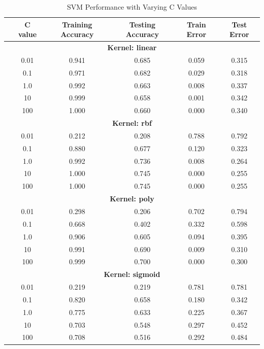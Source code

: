 \documentclass[a4paper,10 pt]{article}
\begin{document}
    \begin{table}[H]
      \centering
      \caption{SVM Performance with Varying C Values}
      \label{tab:svm_performance}
      \begin{tabular}{@{}cccccc@{}}
                \toprule
         & C value & Training Accuracy & Testing Accuracy & Train Error & Test Error \\
        \midrule
        \multicolumn{6}{c}{\textbf{Kernel: linear}} \\
        \midrule
        & 0.01 & 0.941 & 0.685 & 0.059 & 0.315 \\
        & 0.1 & 0.971 & 0.682 & 0.029 & 0.318 \\
        & 1.0 & 0.992 & 0.663 & 0.008 & 0.337 \\
        & 10 & 0.999 & 0.658 & 0.001 & 0.342 \\
        & 100 & 1.000 & 0.660 & 0.000 & 0.340 \\
        \midrule
        \multicolumn{6}{c}{\textbf{Kernel: rbf}} \\
        \midrule
        & 0.01 & 0.212 & 0.208 & 0.788 & 0.792 \\
        & 0.1 & 0.880 & 0.677 & 0.120 & 0.323 \\
        & 1.0 & 0.992 & 0.736 & 0.008 & 0.264 \\
        & 10 & 1.000 & 0.745 & 0.000 & 0.255 \\
        & 100 & 1.000 & 0.745 & 0.000 & 0.255 \\
        \midrule
        \multicolumn{6}{c}{\textbf{Kernel: poly}} \\
        \midrule
        & 0.01 & 0.298 & 0.206 & 0.702 & 0.794 \\
        & 0.1 & 0.668 & 0.402 & 0.332 & 0.598 \\
        & 1.0 & 0.906 & 0.605 & 0.094 & 0.395 \\
        & 10 & 0.991 & 0.690 & 0.009 & 0.310 \\
        & 100 & 0.999 & 0.700 & 0.000 & 0.300 \\
        \midrule
        \multicolumn{6}{c}{\textbf{Kernel: sigmoid}} \\
        \midrule
        & 0.01 & 0.219 & 0.219 & 0.781 & 0.781 \\
        & 0.1 & 0.820 & 0.658 & 0.180 & 0.342 \\
        & 1.0 & 0.775 & 0.633 & 0.225 & 0.367 \\
        & 10 & 0.703 & 0.548 & 0.297 & 0.452 \\
        & 100 & 0.708 & 0.516 & 0.292 & 0.484 \\
        \bottomrule
      \end{tabular}
  \end{table}
\end{document}
